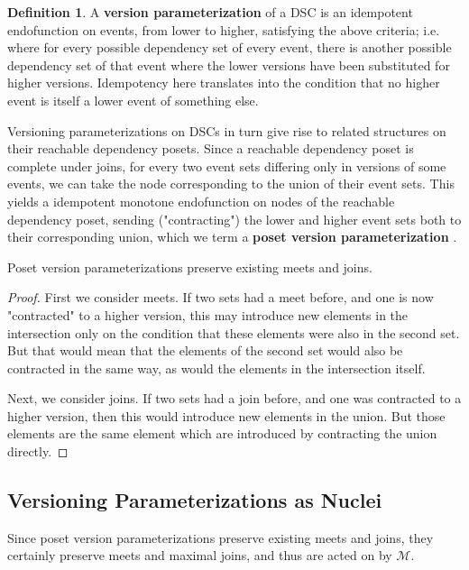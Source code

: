 \documentclass[hoptionsi,review,format=acmsmall]{acmart}
\theoremstyle{definition}
\newtheorem{definition}{Definition}[section]
\newcommand{\Mcc}{\mathcal{M}}
\begin{document}
\begin{definition}
A \textbf{version parameterization} of a DSC is an idempotent endofunction on events, from lower to higher, satisfying the above criteria; i.e. where for every possible dependency set of every event, there is another possible dependency set of that event where the lower versions have been substituted for higher versions. Idempotency here translates into the condition that no higher event is itself a lower event of something else.
\end{definition}

Versioning parameterizations on DSCs in turn give rise to related structures on their reachable dependency posets. Since a reachable dependency poset is complete under joins, for every two event sets differing only in versions of some events, we can take the node corresponding to the union of their event sets. This yields a idempotent monotone endofunction on nodes of the reachable dependency poset, sending ("contracting") the lower and higher event sets both to their corresponding union, which we term a \textbf{poset version parameterization} .

\begin{lemma}
Poset version parameterizations preserve existing meets and joins.
\end{lemma}
\begin{proof}
First we consider meets. If two sets had a meet before, and one is now "contracted" to a higher version, this may introduce new elements in the intersection only on the condition that these elements were also in the second set. But that would mean that the elements of the second set would also be contracted in the same way, as would the elements in the intersection itself.

Next, we consider joins. If two sets had a join before, and one was contracted to a higher version, then this would introduce new elements in the union. But those elements are the same element which are introduced by contracting the union directly.
\end{proof}

\subsection{Versioning Parameterizations as Nuclei}

Since poset version parameterizations preserve existing meets and joins, they certainly preserve meets and maximal joins, and thus are acted on by \(\Mcc\).
\end{document}
